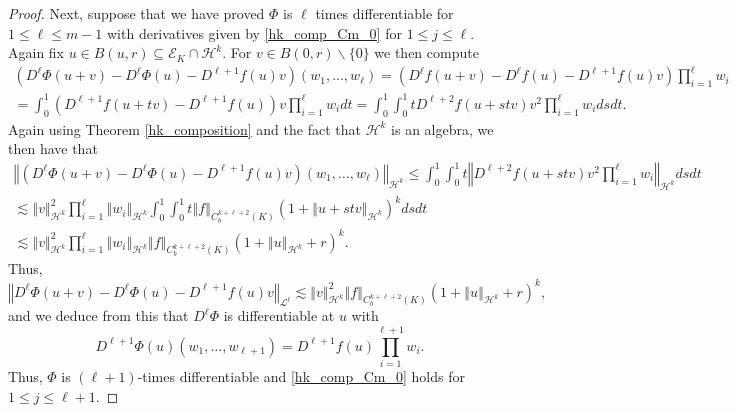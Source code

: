 \documentclass[10pt,a4paper]{amsart}
\theoremstyle{plain}
\theoremstyle{definition}
\theoremstyle{remark}
\def\L{\mathcal{L}}
\def\h{\mathcal{H}}
\def\ls{\lesssim}
\providecommand{\norm}[1]{\left\Vert#1\right\Vert}
\begin{document}
\begin{proof}
Next, suppose that we have proved $\Phi$ is $\ell$ times differentiable for $1\le \ell \le m-1$ with derivatives given by \eqref{hk_comp_Cm_0} for $1\le j \le \ell$.    Again fix $u \in B(u,r) \subseteq \mathcal{E}_K \cap \h^k$.  For $v \in B(0,r) \backslash \{0\}$ we then compute 
\begin{multline}
(D^\ell \Phi(u+v)  - D^\ell\Phi(u) - D^{\ell+1} f(u)v) (w_1,\dotsc,w_\ell) = (D^\ell f(u+v) -D^\ell f(u) - D^{\ell+1}f(u)v) \prod_{i=1}^\ell w_i  \\
= \int_0^1 (D^{\ell+1} f(u+tv) - D^{\ell+1}f(u))v \prod_{i=1}^\ell w_i dt = \int_0^1 \int_0^1 t D^{\ell+2} f(u+stv) v^2 \prod_{i=1}^\ell w_i ds dt. 
\end{multline}
Again using Theorem \ref{hk_composition} and the fact that $\h^k$ is an algebra, we then have that 
\begin{multline}
\norm{(D^\ell \Phi(u+v)  - D^\ell\Phi(u) - D^{\ell+1} f(u)v) (w_1,\dotsc,w_\ell)}_{\h^k} \le \int_0^1 \int_0^1 t \norm{D^{\ell+2} f(u+stv) v^2 \prod_{i=1}^\ell w_i}_{\h^k} ds dt \\
\ls \norm{v}_{\h^k}^2 \prod_{i=1}^\ell \norm{w_i}_{\h^k} \int_0^1 \int_0^1 t \norm{f}_{C^{k+\ell+2}_b(K)}(1+ \norm{u+st v}_{\h^k} )^k dsdt  \\
\ls \norm{v}_{\h^k}^2 \prod_{i=1}^\ell \norm{w_i}_{\h^k}  \norm{f}_{C^{k+\ell+2}_b(K)} (1+ \norm{u}_{\h^k} + r)^k.
\end{multline}
Thus, 
\begin{equation}
 \norm{D^\ell \Phi(u+v)  - D^\ell\Phi(u) - D^{\ell+1} f(u)v }_{\L^\ell } \ls \norm{v}_{\h^k}^2   \norm{f}_{C^{k+\ell+2}_b(K)} (1+ \norm{u}_{\h^k} + r)^k,
\end{equation}
and we deduce from this that $D^\ell \Phi$ is differentiable at $u$ with 
\begin{equation}
D^{\ell+1} \Phi(u)(w_1,\dotsc,w_{\ell+1}) = D^{\ell+1}f(u) \prod_{i=1}^{\ell+1} w_i. 
\end{equation}
Thus, $\Phi$ is $(\ell+1)$-times differentiable and \eqref{hk_comp_Cm_0} holds for $1\le j \le \ell+1$.


\end{proof}
\end{document}
